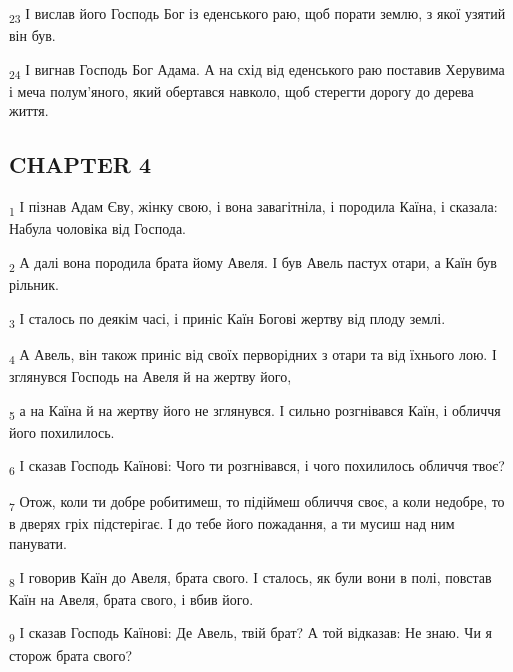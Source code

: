 \begin{tcolorbox}
\textsubscript{23} І вислав його Господь Бог із еденського раю, щоб порати землю, з якої узятий він був.
\end{tcolorbox}
\begin{tcolorbox}
\textsubscript{24} І вигнав Господь Бог Адама. А на схід від еденського раю поставив Херувима і меча полум'яного, який обертався навколо, щоб стерегти дорогу до дерева життя.
\end{tcolorbox}
\subsection{CHAPTER 4}
\begin{tcolorbox}
\textsubscript{1} І пізнав Адам Єву, жінку свою, і вона завагітніла, і породила Каїна, і сказала: Набула чоловіка від Господа.
\end{tcolorbox}
\begin{tcolorbox}
\textsubscript{2} А далі вона породила брата йому Авеля. І був Авель пастух отари, а Каїн був рільник.
\end{tcolorbox}
\begin{tcolorbox}
\textsubscript{3} І сталось по деякім часі, і приніс Каїн Богові жертву від плоду землі.
\end{tcolorbox}
\begin{tcolorbox}
\textsubscript{4} А Авель, він також приніс від своїх перворідних з отари та від їхнього лою. І зглянувся Господь на Авеля й на жертву його,
\end{tcolorbox}
\begin{tcolorbox}
\textsubscript{5} а на Каїна й на жертву його не зглянувся. І сильно розгнівався Каїн, і обличчя його похилилось.
\end{tcolorbox}
\begin{tcolorbox}
\textsubscript{6} І сказав Господь Каїнові: Чого ти розгнівався, і чого похилилось обличчя твоє?
\end{tcolorbox}
\begin{tcolorbox}
\textsubscript{7} Отож, коли ти добре робитимеш, то підіймеш обличчя своє, а коли недобре, то в дверях гріх підстерігає. І до тебе його пожадання, а ти мусиш над ним панувати.
\end{tcolorbox}
\begin{tcolorbox}
\textsubscript{8} І говорив Каїн до Авеля, брата свого. І сталось, як були вони в полі, повстав Каїн на Авеля, брата свого, і вбив його.
\end{tcolorbox}
\begin{tcolorbox}
\textsubscript{9} І сказав Господь Каїнові: Де Авель, твій брат? А той відказав: Не знаю. Чи я сторож брата свого?
\end{tcolorbox}
